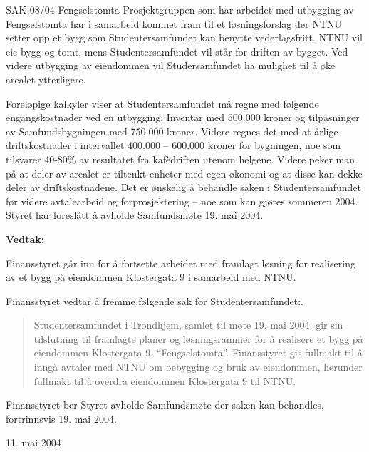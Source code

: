 \begin{instruksledd}{SAK 08/04 Fengselstomta}
    Prosjektgruppen som har arbeidet med utbygging av Fengselstomta har i samarbeid kommet
    fram til et løsningsforslag
    der NTNU setter opp et bygg som Studentersamfundet kan benytte vederlagsfritt. NTNU
    vil eie bygg og tomt, mens
    Studentersamfundet vil står for driften av bygget. Ved videre utbygging av eiendommen
    vil Studersamfundet ha
    mulighet til å øke arealet ytterligere.
    
    Foreløpige kalkyler viser at Studentersamfundet må regne med følgende engangskostnader
    ved en utbygging: Inventar
    med 500.000 kroner og tilpasninger av Samfundsbygningen med 750.000 kroner. Videre
    regnes det med at årlige
    driftskostnader i intervallet 400.000 – 600.000 kroner for bygningen, noe som
    tilsvarer 40-80\% av resultatet fra
    kafèdriften utenom helgene. Videre peker man på at deler av arealet er tiltenkt
    enheter med egen økonomi og at disse
    kan dekke deler av driftskostnadene.
    Det er ønskelig å behandle saken i Studentersamfundet før videre avtalearbeid og
    forprosjektering – noe som kan
    gjøres sommeren 2004. Styret har foreslått å avholde Samfundsmøte 19. mai 2004.
    
    \textbf{Vedtak:}

    Finansstyret går inn for å fortsette arbeidet med framlagt løsning for realisering av
    et bygg på eiendommen
    Klostergata 9 i samarbeid med NTNU.
    
    Finansstyret vedtar å fremme følgende sak for Studentersamfundet:.
    
    \begin{quote}
        Studentersamfundet i Trondhjem, samlet til møte 19. mai 2004, gir sin tilslutning til
        framlagte planer og
        løsningsrammer for å realisere et bygg på eiendommen Klostergata 9, ``Fengselstomta''.
        Finansstyret gis fullmakt til å inngå avtaler med NTNU om bebygging og bruk av
        eiendommen, herunder fullmakt til å
        overdra eiendommen Klostergata 9 til NTNU.
    \end{quote}

    Finansstyret ber Styret avholde Samfundsmøte der saken kan behandles, fortrinnsvis 19.
    mai 2004.

    11. mai 2004

\end{instruksledd}

